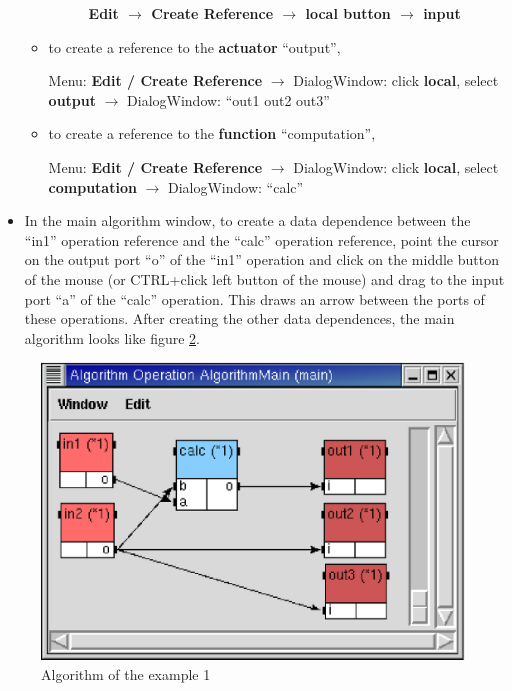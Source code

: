 \documentclass[a4paper,twoside]{report}
\begin{document}
\begin{itemize}
\begin{itemize}
\begin{figure}[htbp]
\caption{\textbf{Edit $\rightarrow$ Create Reference $\rightarrow$ local button
$\rightarrow$ input}}

\label{in1_in2}
\end{figure}

\item to create a reference to the \textbf{actuator} ``output'',

Menu: \textbf{Edit / Create Reference}
$\rightarrow$ DialogWindow: click \textbf{local}, select \textbf{output}
$\rightarrow$ DialogWindow: ``out1 out2 out3''

\item to create a reference to the \textbf{function} ``computation'', 

Menu: \textbf{Edit / Create Reference}
$\rightarrow$ DialogWindow: click \textbf{local}, select \textbf{computation}
$\rightarrow$ DialogWindow: ``calc''

\end{itemize}


\item In the main algorithm window, to create a data dependence between the
``in1'' operation reference and the ``calc'' operation reference, point the
cursor on the output port ``o'' of the ``in1'' operation and click on the
middle button of the mouse (or CTRL+click left button of the mouse) and drag to
the input port ``a'' of the ``calc'' operation. This draws an arrow between the
ports of these operations. After creating the other data dependences, the main
algorithm looks like figure \ref{algo1}.

\end{itemize}

\begin{figure}[htbp]
  \begin{center}
       \includegraphics[scale=0.75]{algorithm_ex1.eps}
  \end{center}
  \caption{Algorithm of the example 1}
  \label{algo1}
\end{figure}
\end{document}
